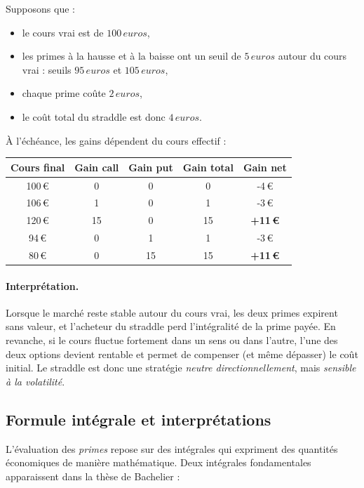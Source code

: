 \documentclass[12pt,a4paper]{article}
\begin{document}
Supposons que :
\begin{itemize}
    \item le cours vrai est de \( 100\,euros \),
    \item les primes à la hausse et à la baisse ont un seuil de \( 5\,euros \) autour du cours vrai : seuils \( 95\,euros \) et \( 105\,euros \),
    \item chaque prime coûte \( 2\,euros \),
    \item le coût total du straddle est donc \( 4\,euros \).
\end{itemize}

À l’échéance, les gains dépendent du cours effectif :

\begin{center}
\begin{tabular}{c|c|c|c|c}
\hline
Cours final & Gain call & Gain put & Gain total & Gain net \\
\hline
100\,€ & 0 & 0 & 0 & -4\,€ \\
106\,€ & 1 & 0 & 1 & -3\,€ \\
120\,€ & 15 & 0 & 15 & \textbf{+11\,€} \\
94\,€ & 0 & 1 & 1 & -3\,€ \\
80\,€ & 0 & 15 & 15 & \textbf{+11\,€} \\
\hline
\end{tabular}
\end{center}

\paragraph{Interprétation.}

Lorsque le marché reste stable autour du cours vrai, les deux primes expirent sans valeur, et l’acheteur du straddle perd l’intégralité de la prime payée. En revanche, si le cours fluctue fortement dans un sens ou dans l’autre, l’une des deux options devient rentable et permet de compenser (et même dépasser) le coût initial. Le straddle est donc une stratégie \textit{neutre directionnellement}, mais \textit{sensible à la volatilité}.

\subsection{Formule intégrale et interprétations}

L’évaluation des \textit{primes} repose sur des intégrales qui expriment des quantités économiques de manière mathématique. Deux intégrales fondamentales apparaissent dans la thèse de Bachelier :
\end{document}

